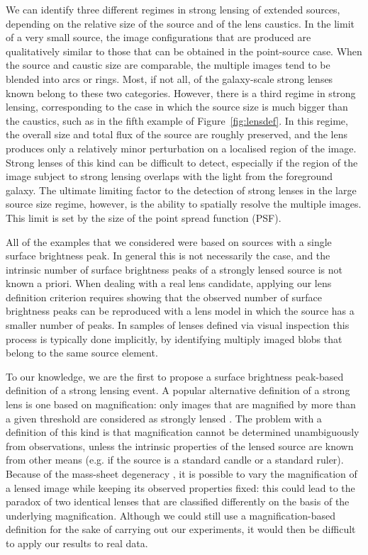 \documentclass{aa}
\def\Fref#1{Figure~\ref{#1}\xspace}
\begin{document}
We can identify three different regimes in strong lensing of extended sources, depending on the relative size of the source and of the lens caustics.
In the limit of a very small source, the image configurations that are produced are qualitatively similar to those that can be obtained in the point-source case.
When the source and caustic size are comparable, the multiple images tend to be blended into arcs or rings. 
Most, if not all, of the galaxy-scale strong lenses known belong to these two categories.
However, there is a third regime in strong lensing, corresponding to the case in which the source size is much bigger than the caustics, such as in the fifth example of \Fref{fig:lensdef}.
In this regime, the overall size and total flux of the source are roughly preserved, and the lens produces only a relatively minor perturbation on a localised region of the image.
Strong lenses of this kind can be difficult to detect, especially if the region of the image subject to strong lensing overlaps with the light from the foreground galaxy. 
The ultimate limiting factor to the detection of strong lenses in the large source size regime, however, is the ability to spatially resolve the multiple images. This limit is set by the size of the point spread function (PSF).

All of the examples that we considered were based on sources with a single surface brightness peak.
In general this is not necessarily the case, and the intrinsic number of surface brightness peaks of a strongly lensed source is not known a priori.
When dealing with a real lens candidate, applying our lens definition criterion requires showing that the observed number of surface brightness peaks can be reproduced with a lens model in which the source has a smaller number of peaks.
In samples of lenses defined via visual inspection this process is typically done implicitly, by identifying multiply imaged blobs that belong to the same source element.

To our knowledge, we are the first to propose a surface brightness peak-based definition of a strong lensing event.
A popular alternative definition of a strong lens is one based on magnification: only images that are magnified by more than a given threshold are considered as strongly lensed \citep[see e.g.][]{Hil++07}.
The problem with a definition of this kind is that magnification cannot be determined unambiguously from observations, unless the intrinsic properties of the lensed source are known from other means (e.g. if the source is a standard candle or a standard ruler).
Because of the mass-sheet degeneracy \citep{FGS85}, it is possible to vary the magnification of a lensed image while keeping its observed properties fixed: this could lead to the paradox of two identical lenses that are classified differently on the basis of the underlying magnification.
Although we could still use a magnification-based definition for the sake of carrying out our experiments, it would then be difficult to apply our results to real data.
\end{document}
